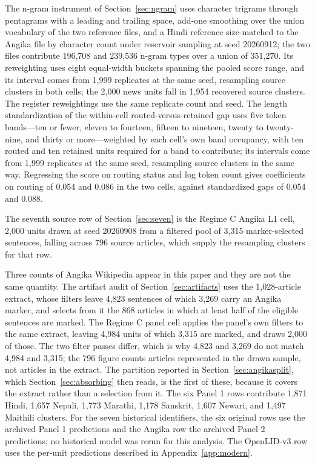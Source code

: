 \documentclass[final]{clv2025}
\begin{document}
The n-gram instrument of Section~\ref{sec:ngram} uses character trigrams through pentagrams with a leading and trailing space, add-one smoothing over the union vocabulary of the two reference files, and a Hindi reference size-matched to the Angika file by character count under reservoir sampling at seed 20260912; the two files contribute 196{,}708 and 239{,}536 n-gram types over a union of 351{,}270. Its reweighting uses eight equal-width buckets spanning the pooled score range, and its interval comes from 1{,}999 replicates at the same seed, resampling source clusters in both cells; the 2{,}000 news units fall in 1{,}954 recovered source clusters. The register reweightings use the same replicate count and seed. The length standardization of the within-cell routed-versus-retained gap uses five token bands---ten or fewer, eleven to fourteen, fifteen to nineteen, twenty to twenty-nine, and thirty or more---weighted by each cell's own band occupancy, with ten routed and ten retained units required for a band to contribute; its intervals come from 1{,}999 replicates at the same seed, resampling source clusters in the same way. Regressing the score on routing status and log token count gives coefficients on routing of 0.054 and 0.086 in the two cells, against standardized gaps of 0.054 and 0.088.

The seventh source row of Section~\ref{sec:seven} is the Regime C Angika L1 cell, 2,000 units drawn at seed 20260908 from a filtered pool of 3,315 marker-selected sentences, falling across 796 source articles, which supply the resampling clusters for that row.

Three counts of Angika Wikipedia appear in this paper and they are not the same quantity. The artifact audit of Section~\ref{sec:artifacts} uses the 1,028-article extract, whose filters leave 4,823 sentences of which 3,269 carry an Angika marker, and selects from it the 868 articles in which at least half of the eligible sentences are marked. The Regime C panel cell applies the panel's own filters to the same extract, leaving 4,984 units of which 3,315 are marked, and draws 2,000 of those. The two filter passes differ, which is why 4,823 and 3,269 do not match 4,984 and 3,315; the 796 figure counts articles represented in the drawn sample, not articles in the extract. The partition reported in Section~\ref{sec:angikasplit}, which Section~\ref{sec:absorbing} then reads, is the first of these, because it covers the extract rather than a selection from it. The six Panel 1 rows contribute 1,871 Hindi, 1,657 Nepali, 1,773 Marathi, 1,178 Sanskrit, 1,607 Newari, and 1,497 Maithili clusters. For the seven historical identifiers, the six original rows use the archived Panel 1 predictions and the Angika row the archived Panel 2 predictions; no historical model was rerun for this analysis. The OpenLID-v3 row uses the per-unit predictions described in Appendix~\ref{app:modern}.
\end{document}
